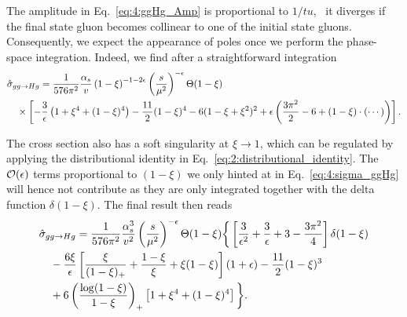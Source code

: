The amplitude in Eq.~\eqref{eq:4:ggHg_Amp} is proportional to $1/tu$, \ie\ it diverges if the final state gluon becomes collinear to one of the initial state gluons. Consequently, we expect the appearance of poles once we perform the phase-space integration. Indeed, we find after a straightforward integration
\begin{equation}
\begin{split}
& \hat{\sigma}_{gg \rightarrow H g} = \frac{1}{576 \pi^2} \frac{\alpha_s}{v} \left(1 - \xi \right)^{-1 - 2 \epsilon} \left( \frac{s}{\mu^2} \right)^{-\epsilon} \Theta (1 - \xi) \\
& \quad \times \left[ - \frac{3}{\epsilon} \left(1 + \xi^4 + (1 - \xi)^4 \right) - \frac{11}{2} (1 - \xi)^4 - 6 (1 - \xi + \xi^2)^2 + \epsilon \left( \frac{3 \pi^2}{2} - 6 + (1 - \xi)\cdot \left(\cdots \right) \right) \right].
\label{eq:4:sigma_ggHg}
\end{split}
\end{equation}

The cross section also has a soft singularity at $\xi \rightarrow 1$, which can be regulated by applying the distributional identity in Eq.~\eqref{eq:2:distributional_identity}. The $\mathcal{O}\!\left(\epsilon\right)$ terms proportional to $(1 - \xi)$ we only hinted at in Eq.~\eqref{eq:4:sigma_ggHg} will hence not contribute as they are only integrated together with the delta function $\delta (1 - \xi)$. The final result then reads
\begin{equation}
\begin{split}
& \hat{\sigma}_{gg \rightarrow H g} = \frac{1}{576 \pi^2} \frac{\alpha_s^3}{v^2} \left(\frac{s}{\mu^2} \right)^{-\epsilon} \Theta (1 - \xi) \bigg \lbrace \left[ \frac{3}{\epsilon^2} + \frac{3}{\epsilon} + 3 - \frac{3 \pi^2}{4} \right] \delta(1 - \xi) \\
&\quad - \frac{6 \xi}{\epsilon} \left[ \frac{\xi}{(1 - \xi)_+} + \frac{1 - \xi}{\xi} + \xi (1 - \xi) \right] (1 + \epsilon) - \frac{11}{2} (1 - \xi)^3 \\
& \quad + 6 \left(\frac{\log (1 - \xi)}{1 - \xi} \right)_+ \left[1 + \xi^4 + (1 - \xi)^4 \right]  \bigg \rbrace.
\end{split}
\label{eq:4:sigma_ggHg_full}
\end{equation}

